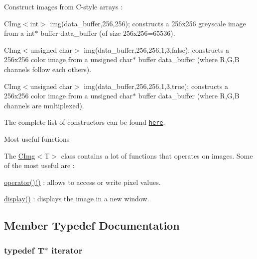 \begin{DoxyItemize}
\item Construct images from C-\/style arrays :
\begin{DoxyItemize}
\item {\ttfamily CImg$<$int$>$ img(data\_\-buffer,256,256);} constructs a 256x256 greyscale image from a {\ttfamily int$\ast$} buffer {\ttfamily data\_\-buffer} (of size 256x256=65536).
\item {\ttfamily CImg$<$unsigned char$>$ img(data\_\-buffer,256,256,1,3,false);} constructs a 256x256 color image from a {\ttfamily unsigned} {\ttfamily char$\ast$} buffer {\ttfamily data\_\-buffer} (where R,G,B channels follow each others).
\item {\ttfamily CImg$<$unsigned char$>$ img(data\_\-buffer,256,256,1,3,true);} constructs a 256x256 color image from a {\ttfamily unsigned} {\ttfamily char$\ast$} buffer {\ttfamily data\_\-buffer} (where R,G,B channels are multiplexed).
\end{DoxyItemize}
\end{DoxyItemize}

The complete list of constructors can be found \href{#constructors}{\tt here}.

\begin{DoxyParagraph}{Most useful functions}

\end{DoxyParagraph}
The \hyperlink{structcimg__library_1_1CImg}{CImg}$<${\ttfamily T$>$} class contains a lot of functions that operates on images. Some of the most useful are :


\begin{DoxyItemize}
\item \hyperlink{structcimg__library_1_1CImg_accb8526e4303186fb6246ac1301fdf66}{operator()()} : allows to access or write pixel values.
\item \hyperlink{structcimg__library_1_1CImg_aea0592215c6068e617a975a1fe5b7b7b}{display()} : displays the image in a new window. 
\end{DoxyItemize}

\subsection{Member Typedef Documentation}
\hypertarget{structcimg__library_1_1CImg_a35c955cacac6aacaa1e82874b1628865}{
\subsubsection[{iterator}]{\setlength{\rightskip}{0pt plus 5cm}typedef T$\ast$ {\bf iterator}}}
\label{structcimg__library_1_1CImg_a35c955cacac6aacaa1e82874b1628865}


